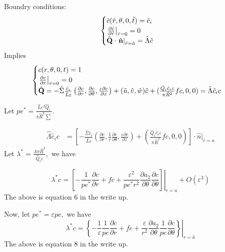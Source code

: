 \documentclass[12pt]{article}
\renewcommand{\(}{\left (}
\renewcommand{\)}{\right )}
\begin{document}
Boundry conditions:
\begin{equation}
	\begin{cases}
	\hat{c}(\hat{r}, {\theta}, 0, \hat{t})=\hat{c}_{i} \\
	\left.\frac{\partial \hat{c}}{\partial \hat{r}}\right|_{\hat{r}=0}=0\\
	\hat{\bold{Q}} \cdot\left.\hat{\bold{n}}\right|_{\hat{r}=\hat{a}}=\hat{\Lambda} \hat{c}
	\end{cases}
\end{equation}
Implies
\begin{equation}
	\begin{cases}
	c(r, \theta, 0, t)=1 \\
	\left.\frac{\partial c}{\partial r}\right|_{r=0}=0\\
	\hat{\bold{Q}} = -\hat{\Sigma} \frac{\hat{c}_{i}}{\hat{L} \varepsilon}\left(\frac{\partial c}{\partial r}, \frac{\partial c}{\partial \theta}, \frac{\varepsilon \partial c}{\partial z}\right) + (\hat{u}, \hat{v}, \hat{w}) \hat{c} + (\frac{\hat{Q}_i \hat{c}_{i} \varepsilon}{\pi \hat{R}^{2}} f c, 0, 0) = \hat{\Lambda} \hat{c}_i c
	\end{cases}
\end{equation}

Let $pe^{*}=\frac{\hat{L} \varepsilon^{2} \hat{Q}_{i}}{\pi \hat{R}^{2} \hat{\sum}}.$

\begin{align}
	\hat{\Lambda} \hat{c}_i c &= \left[-\frac{\hat{\Sigma} \hat{c}_i}{\hat{L}\varepsilon}\left(\frac{\partial c}{\partial r}, \frac{1}{r} \frac{\partial c}{\partial \theta}, \frac{\varepsilon \partial c}{\partial z}\right) + \left(\frac{\hat{Q}_i \hat{c}_i \varepsilon}{\pi \hat{R}^2}fc, 0,0\right)\right]\cdot \hat{n} \Bigg\rvert_{r = {a}}
\end{align}
Let $\lambda ^* = \frac{\hat{\Lambda} \pi \hat{R}^{2}}{\widehat{Q}_{i} \varepsilon},$ we have

\begin{equation}
\lambda^{*} c=\left.\left[-\frac{1}{pe^{*}} \frac{\partial c}{\partial r}+f c+\frac{\varepsilon^2}{pe^{*}r^{2}} \frac{\partial a_{2}}{\partial \theta}\frac{\partial c}{\partial \theta}\right]\right|_{r={a}} + O\left(\varepsilon^{3}\right)
\end{equation}
The above is equation 6 in the write up.

Now, let $pe^{*} = \varepsilon pe,$ we have
\begin{equation}
	\lambda^* c =\left.\left\{-\frac{1}{\varepsilon}\frac{1}{pe} \frac{\partial c}{\partial r}+f c+\frac{\varepsilon}{r^{2}} \frac{\partial a_{2}}{\partial \theta}\frac{1}{pe}\frac{\partial c}{\partial \theta}\right\}\right|_{r=\hat{a}}
\end{equation}
The above is equation $8$ in the write up.
\end{document}
